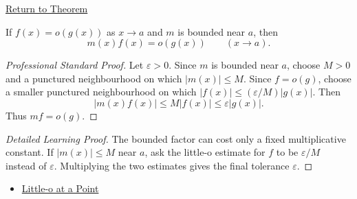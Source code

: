 \newpage
{}
\label{prf:little-o-bounded-factor-rule}

\begin{remark*}[Return]
\hyperref[prop:little-o-bounded-factor-rule]{Return to Theorem}
\end{remark*}

\begin{proposition*}
If $f(x)=o(g(x))$ as $x\to a$ and $m$ is bounded near $a$, then
\[
  m(x)f(x)=o(g(x))\qquad (x\to a).
\]
\end{proposition*}

\begin{proof}[Professional Standard Proof]
\LRAProofBodyStart
Let $\varepsilon>0$. Since $m$ is bounded near $a$, choose $M>0$ and a
punctured neighbourhood on which $|m(x)|\leq M$. Since $f=o(g)$, choose a
smaller punctured neighbourhood on which
$|f(x)|\leq(\varepsilon/M)|g(x)|$. Then
\[
  |m(x)f(x)|\leq M|f(x)|\leq \varepsilon |g(x)|.
\]
Thus $mf=o(g)$.
\end{proof}

\begin{proof}[Detailed Learning Proof]
\LRAProofBodyStart
The bounded factor can cost only a fixed multiplicative constant. If
$|m(x)|\leq M$ near $a$, ask the little-o estimate for $f$ to be
$\varepsilon/M$ instead of $\varepsilon$. Multiplying the two estimates gives
the final tolerance $\varepsilon$.
\end{proof}

\begin{dependencies}
\begin{itemize}
  \item \hyperref[def:little-o-at-a-point]{Little-o at a Point}
\end{itemize}
\end{dependencies}

\clearpage
